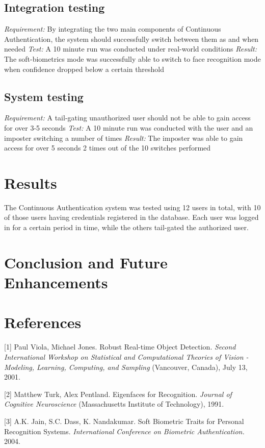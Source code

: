 \documentclass[12pt]{article}			%
\begin{document}
\subsection{ Integration testing}
\emph{ Requirement: } By integrating the two main components of Continuous Authentication, the system should successfully switch between them as and when needed
\emph{ Test: } A 10 minute run was conducted under real-world conditions
\emph{ Result: } The soft-biometrics mode was successfully able to switch to face recognition mode when confidence dropped below a certain threshold

\subsection{ System testing }
\emph{ Requirement: } A tail-gating unauthorized user should not be able to gain access for over 3-5 seconds
\emph{ Test: } A 10 minute run was conducted with the user and an imposter switching a number of times
\emph{ Result: } The imposter was able to gain access for over 5 seconds 2 times out of the 10 switches performed

\section{ Results }
The Continuous Authentication system was tested using 12 users in total, with 10 of those users having credentials registered in the database. Each user was logged in for a certain period in time, while the others tail-gated the authorized user. 

\section{ Conclusion and Future Enhancements }

\section{ References }
[1] Paul Viola, Michael Jones. Robust Real-time Object Detection. \textit {Second International Workshop on Statistical and Computational Theories of Vision - Modeling, Learning, Computing, and Sampling} (Vancouver, Canada), July 13, 2001. 

[2] Matthew Turk, Alex Pentland. Eigenfaces for Recognition. \textit {Journal of Cognitive Neuroscience} (Massachusetts Institute of Technology), 1991. 

[3] A.K. Jain, S.C. Dass, K. Nandakumar. Soft Biometric Traits for Personal Recognition Systems. \textit{ International Conference on Biometric Authentication.} 2004.
 
\end{document}
